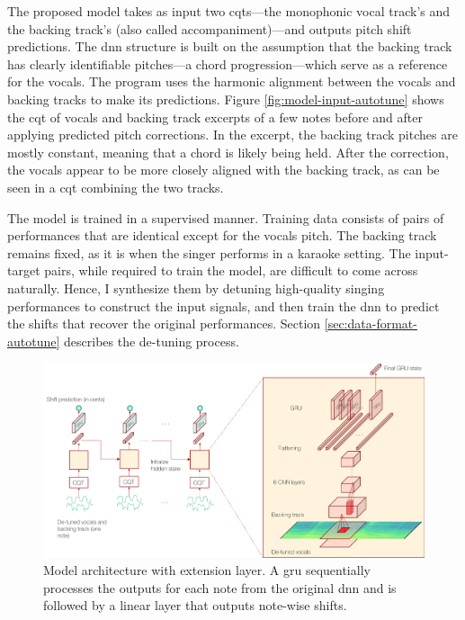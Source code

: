The proposed model takes as input two \gls{cqt}s---the monophonic vocal track's and the backing track's (also called accompaniment)---and outputs pitch shift predictions. The \gls{dnn} structure is built on the assumption that the backing track has clearly identifiable pitches---a chord progression---which serve as a reference for the vocals. The program uses the harmonic alignment between the vocals and backing tracks to make its predictions. Figure \ref{fig:model-input-autotune} shows the \gls{cqt} of vocals and backing track excerpts of a few notes before and after applying predicted pitch corrections. In the excerpt, the backing track pitches are mostly constant, meaning that a chord is likely being held. After the correction, the vocals appear to be more closely aligned with the backing track, as can be seen in a \gls{cqt} combining the two tracks.

The model is trained in a supervised manner. Training data consists of pairs of performances that are identical except for the vocals pitch. The backing track remains fixed, as it is when the singer performs in a karaoke setting. The input-target pairs, while required to train the model, are difficult to come across naturally. Hence, I synthesize them by detuning high-quality singing performances to construct the input signals, and then train the \gls{dnn} to predict the shifts that recover the original performances. Section \ref{sec:data-format-autotune} describes the de-tuning process.
\begin{figure}[t!]
    \centering
    \includegraphics[width=\columnwidth]{images/model_outline_extension.png}
    \caption{Model architecture with extension layer. A \gls{gru} sequentially processes the outputs for each note from the original \gls{dnn} and is followed by a linear layer that outputs note-wise shifts.}
    \label{fig:model_outline_extended}
\end{figure}

